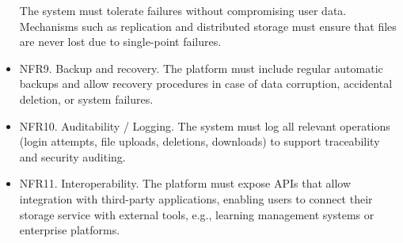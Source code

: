 \begin{itemize}
    The system must tolerate failures without compromising user data. Mechanisms such as replication and distributed storage must ensure that files are never lost due to single-point failures.
    \item NFR9. Backup and recovery.
    The platform must include regular automatic backups and allow recovery procedures in case of data corruption, accidental deletion, or system failures.
    \item NFR10. Auditability / Logging.
    The system must log all relevant operations (login attempts, file uploads, deletions, downloads) to support traceability and security auditing.
    \item NFR11. Interoperability.
    The platform must expose APIs that allow integration with third-party applications, enabling users to connect their storage service with external tools, e.g., learning management systems or enterprise platforms.
\end{itemize}
